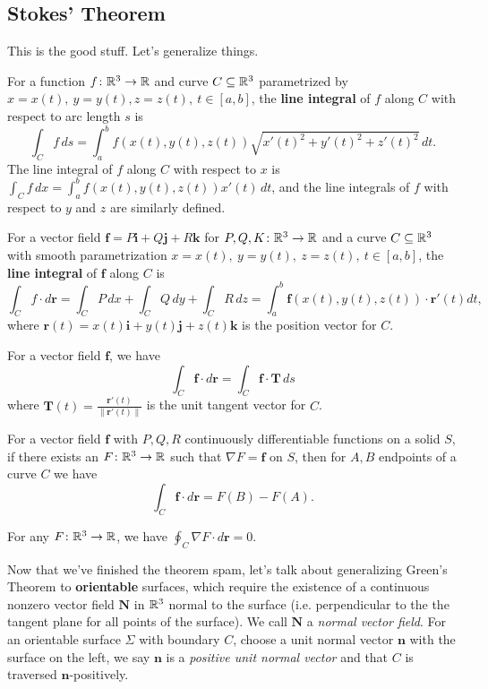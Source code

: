 \subsection{Stokes' Theorem}
This is the good stuff. Let's generalize things.
\begin{definition}[]
    For a function $f \colon \mathbb{R}^3 \to \mathbb{R}$ and curve $C\subseteq \mathbb{R}^3$ parametrized by $x=x(t),\ y=y(t), z=z(t), \ t\in [a,b]$, the \textbf{line integral} of $f$ along $C$ with respect to arc length $s$ is \[
        \int_{C}^{} f \, ds = \int_{a}^{b} f(x(t),y(t),z(t)) \sqrt{x'(t)^2+y'(t)^2+z'(t)^2}  \, dt.
    \] The line integral of $f$ along $C$ with respect to $x$ is $\int_{C}^{} f \, dx=\int_{a}^{b} f(x(t),y(t),z(t))x'(t) \, dt$, and the line integrals of $f$ with respect to $y$ and $z$ are similarly defined. 
\end{definition}
\begin{definition}[]
    For a vector field $\mathbf f=P\mathbf i+Q\mathbf j+R \mathbf k$ for $P,Q,K \colon \mathbb{R}^3 \to \mathbb{R}$ and a curve $C\subseteq \mathbb{R}^3$ with smooth parametrization $x=x(t),\ y=y(t),\ z=z(t), \ t\in [a,b]$, the \textbf{line integral} of $\mathbf f$ along $C$ is \[
        \int_{C}^{} f\cdot d\mathbf r=\int_{C}^{} P \, dx+\int_{C}^{} Q \, dy+\int_{C}^{} R \, dz=\int_{a}^{b} \mathbf f(x(t),y(t),z(t))\cdot \mathbf r'(t)dt,
    \] where $\mathbf r(t)=x(t)\mathbf i+y(t)\mathbf j+z(t)\mathbf k$ is the position vector for $C$.
\end{definition}
\begin{theorem}
    For a vector field $\mathbf f$, we have \[
        \int_{C}^{} \mathbf f\cdot d \mathbf r=\int_{C}^{} \mathbf f\cdot \mathbf T \, ds
    \] where $\mathbf T(t)=\frac{\mathbf r'(t)}{\|\mathbf r'(t)\|}$ is the unit tangent vector for $C$.
\end{theorem}
\begin{theorem}
    For a vector field $\mathbf f$ with $P,Q,R$ continuously differentiable functions on a solid $S$, if there exists an $F \colon \mathbb{R}^3 \to \mathbb{R}$ such that $\nabla F=\mathbf f$ on $S$, then for $A,B$ endpoints of a curve $C$ we have \[
        \int_{C}^{} \mathbf f\cdot d\mathbf r=F(B)-F(A).
    \] 
\end{theorem}
\begin{cor}
    For any $F \colon \mathbb{R}^3 \to \mathbb{R}$, we have $\oint_C \nabla F\cdot d\mathbf r=0$.
\end{cor}
Now that we've finished the theorem spam, let's talk about generalizing Green's Theorem to \textbf{orientable} surfaces, which require the existence of a continuous nonzero vector field $\mathbf N$ in $\mathbb{R}^3$ normal to the surface (i.e. perpendicular to the the tangent plane for all points of the surface). We call $\mathbf N$ a \emph{normal vector field}. For an orientable surface $\Sigma$ with boundary $C$, choose a unit normal vector $\mathbf n$ with the surface on the left, we say $\mathbf n$ is a \emph{positive unit normal vector} and that $C$ is traversed $\mathbf n$-positively. 
